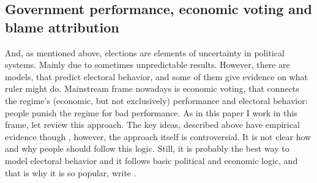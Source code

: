 \documentclass[a4paper, 12pt]{article}
\begin{document}
    \subsection*{Government performance, economic voting and blame attribution}
	And, as mentioned above, elections are elements of uncertainty in political systems. Mainly due to sometimes unpredictable results. However, there are models, that predict electoral behavior, and some of them give evidence on what ruler might do. Mainstream frame nowadays is economic voting, that connects the regime's (economic, but not exclusively) performance and electoral behavior: people punish the regime for bad performance. As in this paper I work in this frame, let review this approach.  The key ideas, described above have empirical evidence though \cite{econ_vote2}, however, the approach itself is controversial. It is not clear how and why people should follow this logic. Still, it is probably the best way to model electoral behavior and it follows basic political and economic logic, and that is why it is so popular, write \cite{econ_vote1}.\\\\
\end{document}
